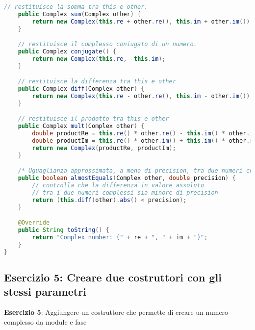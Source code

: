 \documentclass{article}
\begin{document}
\begin{lstlisting}[language=Java,escapechar=|]
    // restituisce la somma tra this e other.
    public Complex sum(Complex other) {
    	return new Complex(this.re + other.re(), this.im + other.im());
    }

    // restituisce il complesso coniugato di un numero.
    public Complex conjugate() {
	    return new Complex(this.re, -this.im);
    }

    // restituisce la differenza tra this e other
    public Complex diff(Complex other) {
	    return new Complex(this.re - other.re(), this.im - other.im());
    }

    // restituisce il prodotto tra this e other
    public Complex mult(Complex other) {
	    double productRe = this.re() * other.re() - this.im() * other.im();
	    double productIm = this.re() * other.im() + this.im() * other.re();
	    return new Complex(productRe, productIm);
    }

    /* Uguaglianza approssimata, a meno di precision, tra due numeri complessi Riguardo all'operazione di uguaglianza tra complessi non e' consigliabile utilizzare l'operatore ==, poiche' in tal modo basterebbe un errore di arrotondamento per far risultare due numeri diversi. Per ovviare a cio' si utilizza un parametro  che indica la tolleranza da adottare.*/
    public boolean almostEquals(Complex other, double precision) {
    	// controlla che la differenza in valore assoluto
	    // tra i due numeri complessi sia minore di precision
	    return (this.diff(other).abs() < precision);
    }

    @Override
    public String toString() {
	    return "Complex number: (" + re + ", " + im + ")";
    }
}
\end{lstlisting}






\subsection{Esercizio 5: Creare due costruttori con gli stessi parametri}
\begin{framed}
\textbf{Esercizio 5}:  Aggiungere un costruttore che permette di creare un numero complesso da module e fase
\end{framed}
\end{document}
